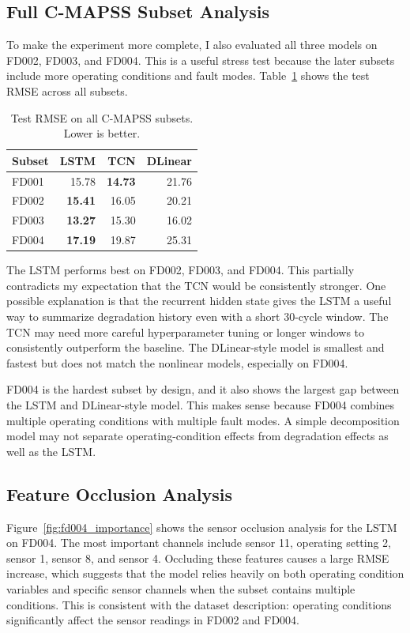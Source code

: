 \documentclass[10pt]{article}
\begin{document}
\subsection{Full C-MAPSS Subset Analysis}

To make the experiment more complete, I also evaluated all three models on FD002, FD003, and FD004. This is a useful stress test because the later subsets include more operating conditions and fault modes. Table~\ref{tab:all_results} shows the test RMSE across all subsets.

\begin{table}[h]
\centering
\caption{Test RMSE on all C-MAPSS subsets. Lower is better.}
\label{tab:all_results}
\begin{tabular}{lrrr}
\toprule
Subset & LSTM & TCN & DLinear \\
\midrule
FD001 & 15.78 & \textbf{14.73} & 21.76 \\
FD002 & \textbf{15.41} & 16.05 & 20.21 \\
FD003 & \textbf{13.27} & 15.30 & 16.02 \\
FD004 & \textbf{17.19} & 19.87 & 25.31 \\
\bottomrule
\end{tabular}
\end{table}

The LSTM performs best on FD002, FD003, and FD004. This partially contradicts my expectation that the TCN would be consistently stronger. One possible explanation is that the recurrent hidden state gives the LSTM a useful way to summarize degradation history even with a short 30-cycle window. The TCN may need more careful hyperparameter tuning or longer windows to consistently outperform the baseline. The DLinear-style model is smallest and fastest but does not match the nonlinear models, especially on FD004.

FD004 is the hardest subset by design, and it also shows the largest gap between the LSTM and DLinear-style model. This makes sense because FD004 combines multiple operating conditions with multiple fault modes. A simple decomposition model may not separate operating-condition effects from degradation effects as well as the LSTM.

\subsection{Feature Occlusion Analysis}

Figure~\ref{fig:fd004_importance} shows the sensor occlusion analysis for the LSTM on FD004. The most important channels include sensor 11, operating setting 2, sensor 1, sensor 8, and sensor 4. Occluding these features causes a large RMSE increase, which suggests that the model relies heavily on both operating condition variables and specific sensor channels when the subset contains multiple conditions. This is consistent with the dataset description: operating conditions significantly affect the sensor readings in FD002 and FD004.
\end{document}
